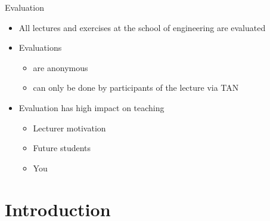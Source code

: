 \begin{frame}{Evaluation}
	\begin{itemize}
		\setlength\itemsep{0.3cm}
		\item All lectures and exercises at the school of engineering are evaluated
		\item Evaluations
		      \begin{itemize}
			      \item are anonymous
			      \item can only be done by participants of the lecture via TAN
		      \end{itemize}
		\item Evaluation has high impact on teaching
		      \begin{itemize}
			      \item Lecturer motivation
			      \item Future students
			      \item You
		      \end{itemize}
	\end{itemize}
\end{frame}

\iffalse
\section{Introduction}

